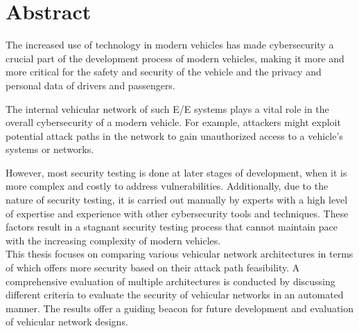 
\chapter*{Abstract}\label{chp:abstract}

The increased use of technology in modern vehicles has made cybersecurity a crucial part of the development process of modern vehicles,
making it more and more critical for the safety and security of the vehicle and the privacy and personal data of drivers and passengers.

The internal vehicular network of such E/E systems plays a vital role in the overall cybersecurity of a modern vehicle.
For example, attackers might exploit potential attack paths in the network to gain unauthorized access to a vehicle's systems or networks.

However, most security testing is done at later stages of development, when it is more complex and costly to address vulnerabilities.
Additionally, due to the nature of security testing, it is carried out manually by experts with a high level of expertise and experience with other cybersecurity tools and techniques.
These factors result in a stagnant security testing process that cannot maintain pace with the increasing complexity of modern vehicles.
\\

This thesis focuses on comparing various vehicular network architectures in terms of which offers more security based on their attack path feasibility.
A comprehensive evaluation of multiple architectures is conducted by discussing different criteria to evaluate the security of vehicular networks in an automated manner.
The results offer a guiding beacon for future development and evaluation of vehicular network designs.